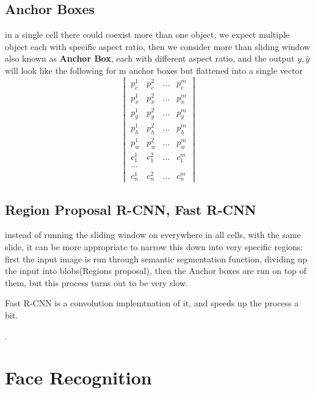 \documentclass[4apaper,12pt]{book}
\begin{document}
\begin{description}
        \subsection{Anchor Boxes}
        \begin{description}
        \item in a single cell there could coexist more than one object, we expect multiple object each with specific aspect ratio, then we consider more than sliding window also known as \textbf{Anchor Box}, each with different aspect ratio, and the output $y,\hat{y}$ will look like the following for m anchor boxes but flattened into a single vector $$ \begin{vmatrix}p_c^1&p_c^{2}&...&p_c^{m}\\p_x^{1}&p_x^{2}&...&p_x^{m}\\p_y^{1}&p_y^{2}&...&p_y^{m}\\p_h^{1}&p_h^{2}&...&p_h^{m}\\p_w^{1}&p_w^2&...&p_w^{m}\\c_1^{1}&c_1^{2}&...&c_1^{m}\\...\\c_n^{1}&c_n^{2}&...&c_n^{m}\end{vmatrix}$$
        \end{description}
        \subsection{Region Proposal R-CNN, Fast R-CNN}
        \begin{description}
        \item instead of running the sliding window on everywhere in all cells, with the same slide, it can be more appropriate to narrow this down into very specific regions: first the input image is run through semantic segmentation function, dividing up the input into blobs(Regions proposal), then the Anchor boxes are run on top of them, but this process turns out to be very slow.
        \item Fast R-CNN is a convolution implemtnation of it, and speeds up the process a bit.
          \end{description}
        \item .
  \end{description}
  \section {Face Recognition }
\end{document}

